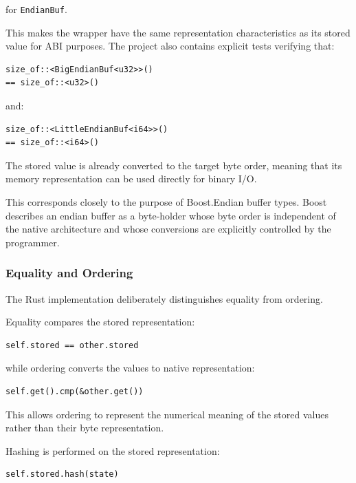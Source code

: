 for \texttt{EndianBuf}.

This makes the wrapper have the same representation characteristics as its stored value for ABI purposes. 
The project also contains explicit tests verifying that:

\begin{lstlisting}[style=rustblock]
size_of::<BigEndianBuf<u32>>()
== size_of::<u32>()
\end{lstlisting}

and:

\begin{lstlisting}[style=rustblock]
size_of::<LittleEndianBuf<i64>>()
== size_of::<i64>()
\end{lstlisting}

The stored value is already converted to the target byte order, meaning that its memory representation can be used 
directly for binary I/O.

This corresponds closely to the purpose of Boost.Endian buffer types. Boost describes an endian buffer as a 
byte-holder whose byte order is independent of the native architecture and whose conversions are explicitly controlled 
by the programmer.

\subsubsection{Equality and Ordering}

The Rust implementation deliberately distinguishes equality from ordering.

Equality compares the stored representation:

\begin{lstlisting}[style=rustblock]
self.stored == other.stored
\end{lstlisting}

while ordering converts the values to native representation:

\begin{lstlisting}[style=rustblock]
self.get().cmp(&other.get())
\end{lstlisting}

This allows ordering to represent the numerical meaning of the stored values rather than their byte representation.

Hashing is performed on the stored representation:

\begin{lstlisting}[style=rustblock]
self.stored.hash(state)
\end{lstlisting}

